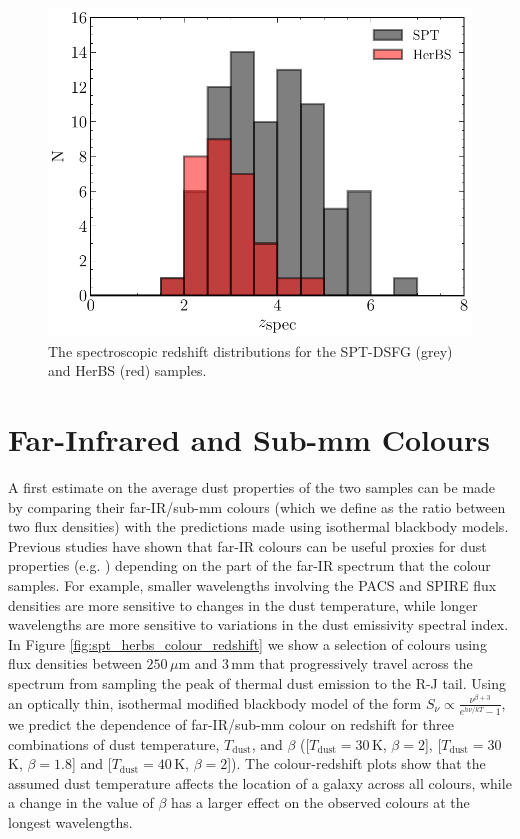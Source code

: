 \begin{figure}
	\centering
	\includegraphics[width=0.8\columnwidth]{Figures/spt_herbs_redshift_distribution.pdf}
	\caption[Spectroscopic redshift distributions of HerBS and SPT-DSFG samples]{The spectroscopic redshift distributions for the SPT-DSFG (grey) and HerBS (red) samples.}
	\label{fig:spt_herbs_redshift}
\end{figure}

\section{Far-Infrared and Sub-mm Colours}
\label{sec:fir_submm_colours}

A first estimate on the average dust properties of the two samples can be made by comparing their far-IR/sub-mm colours (which we define as the ratio between two flux densities) with the predictions made using isothermal blackbody models. Previous studies have shown that far-IR colours can be useful proxies for dust properties (e.g. \citealt{Boselli_2010, Boselli_2012, Remy-Ruyer_2013, Smith_2019}) depending on the part of the far-IR spectrum that the colour samples. For example, smaller wavelengths involving the PACS and SPIRE flux densities are more sensitive to changes in the dust temperature, while longer wavelengths are more sensitive to variations in the dust emissivity spectral index. In Figure \ref{fig:spt_herbs_colour_redshift} we show a selection of colours using flux densities between $250\,\mu$m and $3\,$mm that progressively travel across the spectrum from sampling the peak of thermal dust emission to the R-J tail. Using an optically thin, isothermal modified blackbody model of the form $S_\nu \propto \frac{\nu^{\beta+3}}{e^{h \nu/kT} - 1}$, we predict the dependence of far-IR/sub-mm colour on redshift for three combinations of dust temperature, $T_{\textrm{dust}}$, and $\beta$ ([$T_{\textrm{dust}} = 30\,$K, $\beta = 2$], [$T_{\textrm{dust}} = 30\,$K, $\beta = 1.8$] and [$T_{\textrm{dust}} = 40\,$K, $\beta = 2$]). The colour-redshift plots show that the assumed dust temperature affects the location of a galaxy across all colours, while a change in the value of $\beta$ has a larger effect on the observed colours at the longest wavelengths.

